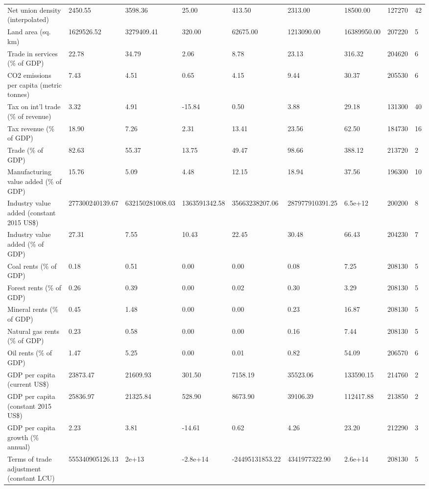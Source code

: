 \begin{longtable}{lllllllll}
Net union density (interpolated) & 2450.55 & 3598.36 & 25.00 & 413.50 & 2313.00 & 18500.00 & 127270 & 42\\
Land area (sq. km) & 1629526.52 & 3279409.41 & 320.00 & 62675.00 & 1213090.00 & 16389950.00 & 207220 & 5\\
\addlinespace
Trade in services (\% of GDP) & 22.78 & 34.79 & 2.06 & 8.78 & 23.13 & 316.32 & 204620 & 6\\
CO2 emissions per capita (metric tonnes) & 7.43 & 4.51 & 0.65 & 4.15 & 9.44 & 30.37 & 205530 & 6\\
Tax on int'l trade (\% of revenue) & 3.32 & 4.91 & -15.84 & 0.50 & 3.88 & 29.18 & 131300 & 40\\
Tax revenue (\% of GDP) & 18.90 & 7.26 & 2.31 & 13.41 & 23.56 & 62.50 & 184730 & 16\\
Trade (\% of GDP) & 82.63 & 55.37 & 13.75 & 49.47 & 98.66 & 388.12 & 213720 & 2\\
\addlinespace
Manufacturing value added (\% of GDP) & 15.76 & 5.09 & 4.48 & 12.15 & 18.94 & 37.56 & 196300 & 10\\
Industry value added (constant 2015 US\$) & 277300240139.67 & 632150281008.03 & 1363591342.58 & 35663238207.06 & 287977910391.25 & 6.5e+12 & 200200 & 8\\
Industry value added (\% of GDP) & 27.31 & 7.55 & 10.43 & 22.45 & 30.48 & 66.43 & 204230 & 7\\
Coal rents (\% of GDP) & 0.18 & 0.51 & 0.00 & 0.00 & 0.08 & 7.25 & 208130 & 5\\
Forest rents (\% of GDP) & 0.26 & 0.39 & 0.00 & 0.02 & 0.30 & 3.29 & 208130 & 5\\
\addlinespace
Mineral rents (\% of GDP) & 0.45 & 1.48 & 0.00 & 0.00 & 0.23 & 16.87 & 208130 & 5\\
Natural gas rents (\% of GDP) & 0.23 & 0.58 & 0.00 & 0.00 & 0.16 & 7.44 & 208130 & 5\\
Oil rents (\% of GDP) & 1.47 & 5.25 & 0.00 & 0.01 & 0.82 & 54.09 & 206570 & 6\\
GDP per capita (current US\$) & 23873.47 & 21609.93 & 301.50 & 7158.19 & 35523.06 & 133590.15 & 214760 & 2\\
GDP per capita (constant 2015 US\$) & 25836.97 & 21325.84 & 528.90 & 8673.90 & 39106.39 & 112417.88 & 213850 & 2\\
\addlinespace
GDP per capita growth (\% annual) & 2.23 & 3.81 & -14.61 & 0.62 & 4.26 & 23.20 & 212290 & 3\\
Terms of trade adjustment (constant LCU) & 555340905126.13 & 2e+13 & -2.8e+14 & -24495131853.22 & 4341977322.90 & 2.6e+14 & 208130 & 5\\

\end{longtable}
